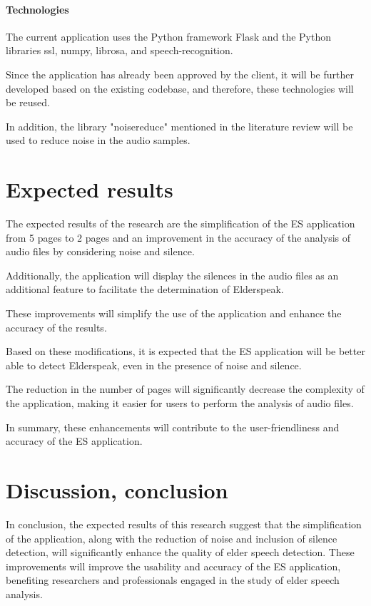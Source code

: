 \documentclass[english]{hogent-article}
\begin{document}
\paragraph{Technologies}
\label{par:technologies}

The current application uses the Python framework Flask and the Python libraries ssl, numpy, librosa, and speech-recognition.

Since the application has already been approved by the client, it will be further developed based on the existing codebase, and therefore, these technologies will be reused.

In addition, the library "noisereduce" \autocite{Sainburg2022} mentioned in the literature review will be used to reduce noise in the audio samples.


\section{Expected results}%
\label{sec:expected-results}

The expected results of the research are the simplification of the ES application from 5 pages to 2 pages and an improvement in the accuracy of the analysis of audio files by considering noise and silence.

Additionally, the application will display the silences in the audio files as an additional feature to facilitate the determination of Elderspeak.

These improvements will simplify the use of the application and enhance the accuracy of the results.

Based on these modifications, it is expected that the ES application will be better able to detect Elderspeak, even in the presence of noise and silence.

The reduction in the number of pages will significantly decrease the complexity of the application, making it easier for users to perform the analysis of audio files.

In summary, these enhancements will contribute to the user-friendliness and accuracy of the ES application.

\section{Discussion, conclusion}%
\label{sec:discussion-conclusion}

In conclusion, the expected results of this research suggest that the simplification of the application, along with the reduction of noise and inclusion of silence detection, will significantly enhance the quality of elder speech detection. These improvements will improve the usability and accuracy of the ES application, benefiting researchers and professionals engaged in the study of elder speech analysis.


\printbibliography[heading=bibintoc]
\end{document}

